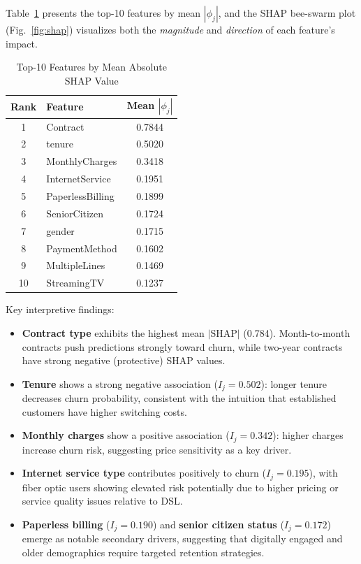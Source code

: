 \documentclass[10pt, conference, letterpaper]{IEEEtran}
\begin{document}
Table~\ref{tab:shap_top10} presents the top-10 features by mean $|\phi_j|$, and the SHAP bee-swarm plot (Fig.~\ref{fig:shap}) visualizes both the \textit{magnitude} and \textit{direction} of each feature's impact.

\begin{table}[htbp]
\caption{Top-10 Features by Mean Absolute SHAP Value}
\label{tab:shap_top10}
\begin{center}
\begin{tabular}{@{}clc@{}}
\toprule
\textbf{Rank} & \textbf{Feature} & \textbf{Mean $|\phi_j|$} \\
\midrule
1  & Contract          & 0.7844 \\
2  & tenure            & 0.5020 \\
3  & MonthlyCharges    & 0.3418 \\
4  & InternetService   & 0.1951 \\
5  & PaperlessBilling  & 0.1899 \\
6  & SeniorCitizen     & 0.1724 \\
7  & gender            & 0.1715 \\
8  & PaymentMethod     & 0.1602 \\
9  & MultipleLines     & 0.1469 \\
10 & StreamingTV       & 0.1237 \\
\bottomrule
\end{tabular}
\end{center}
\end{table}

Key interpretive findings:
\begin{itemize}
    \item \textbf{Contract type} exhibits the highest mean $|\text{SHAP}|$ (0.784). Month-to-month contracts push predictions strongly toward churn, while two-year contracts have strong negative (protective) SHAP values.
    \item \textbf{Tenure} shows a strong negative association ($I_j{=}0.502$): longer tenure decreases churn probability, consistent with the intuition that established customers have higher switching costs.
    \item \textbf{Monthly charges} show a positive association ($I_j{=}0.342$): higher charges increase churn risk, suggesting price sensitivity as a key driver.
    \item \textbf{Internet service type} contributes positively to churn ($I_j{=}0.195$), with fiber optic users showing elevated risk potentially due to higher pricing or service quality issues relative to DSL.
    \item \textbf{Paperless billing} ($I_j{=}0.190$) and \textbf{senior citizen status} ($I_j{=}0.172$) emerge as notable secondary drivers, suggesting that digitally engaged and older demographics require targeted retention strategies.
\end{itemize}
\end{document}
